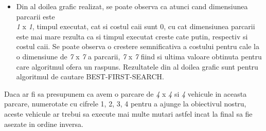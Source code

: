 \documentclass{article}
\begin{document}
\begin{flushleft}
\begin{itemize}
    \item Din al doilea grafic realizat, se poate observa ca atunci cand dimensiunea parcarii este \\ \emph 1 x \emph 1, timpul executat, cat si costul caii sunt 0, cu cat dimensiunea parcarii este mai mare rezulta ca si timpul executat creste cate putin, respectiv si costul caii. Se poate observa o crestere semnificativa a costului pentru cale la o dimensiune de \emph 7 x \emph 7 a parcarii, \emph 7 x \emph 7 fiind si ultima valoare obtinuta pentru care algoritmul ofera un raspuns. Rezultatele din al doilea grafic sunt pentru algoritmul de cautare BEST-FIRST-SEARCH.
    \newline
\end{itemize}
\end{flushleft}
\newpage
\vspace{5mm}
\quad Daca ar fi sa presupunem ca avem o parcare de \emph 4 x \emph 4 si \emph 4 vehicule in aceasta parcare, numerotate cu cifrele 1, 2, 3, 4 pentru a ajunge la obiectivul nostru, aceste vehicule ar trebui sa execute mai multe mutari astfel incat la final sa fie asezate in ordine inversa.\\
\end{document}
